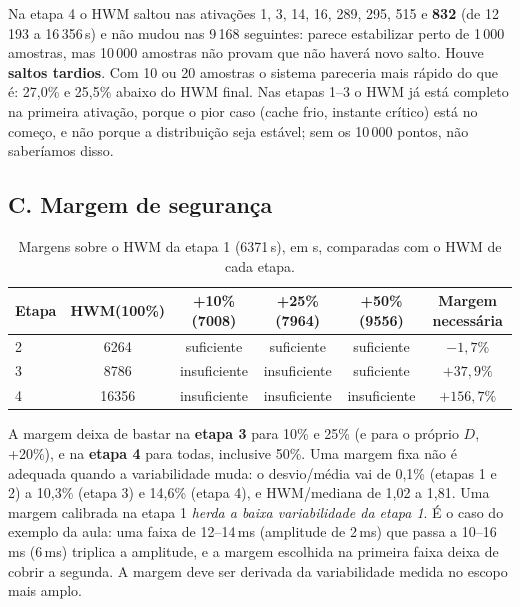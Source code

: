\documentclass[11pt,a4paper]{article}
\begin{document}
Na etapa 4 o HWM saltou nas ativações 1, 3, 14, 16, 289, 295, 515 e \textbf{832} (de 12\,193 a 16\,356\,\textmu s) e não mudou nas 9\,168 seguintes: parece estabilizar perto de 1\,000 amostras, mas 10\,000 amostras não provam que não haverá novo salto. Houve \textbf{saltos tardios}. Com 10 ou 20 amostras o sistema pareceria mais rápido do que é: 27,0\% e 25,5\% abaixo do HWM final. Nas etapas 1--3 o HWM já está completo na primeira ativação, porque o pior caso (cache frio, instante crítico) está no começo, e não porque a distribuição seja estável; sem os 10\,000 pontos, não saberíamos disso.

\subsection*{C. Margem de segurança}
\begin{table}[H]\centering\small
\begin{tabular}{@{}lccccc@{}}
\toprule
\textbf{Etapa} & \textbf{HWM(100\%)} & \textbf{+10\% (7008)} & \textbf{+25\% (7964)} & \textbf{+50\% (9556)} & \textbf{Margem necessária}\\\midrule
2 & 6264 & suficiente & suficiente & suficiente & $-1{,}7\%$\\
3 & 8786 & insuficiente & insuficiente & suficiente & $+37{,}9\%$\\
4 & 16356 & insuficiente & insuficiente & insuficiente & $+156{,}7\%$\\\bottomrule
\end{tabular}
\caption{Margens sobre o HWM da etapa 1 (6371\,\textmu s), em \textmu s, comparadas com o HWM de cada etapa.}
\end{table}
A margem deixa de bastar na \textbf{etapa 3} para 10\% e 25\% (e para o próprio $D$, +20\%), e na \textbf{etapa 4} para todas, inclusive 50\%. Uma margem fixa não é adequada quando a variabilidade muda: o desvio/média vai de 0,1\% (etapas 1 e 2) a 10,3\% (etapa 3) e 14,6\% (etapa 4), e HWM/mediana de 1,02 a 1,81. Uma margem calibrada na etapa 1 \emph{herda a baixa variabilidade da etapa 1}. É o caso do exemplo da aula: uma faixa de 12--14\,ms (amplitude de 2\,ms) que passa a 10--16\,ms (6\,ms) triplica a amplitude, e a margem escolhida na primeira faixa deixa de cobrir a segunda. A margem deve ser derivada da variabilidade medida no escopo mais amplo.
\end{document}
